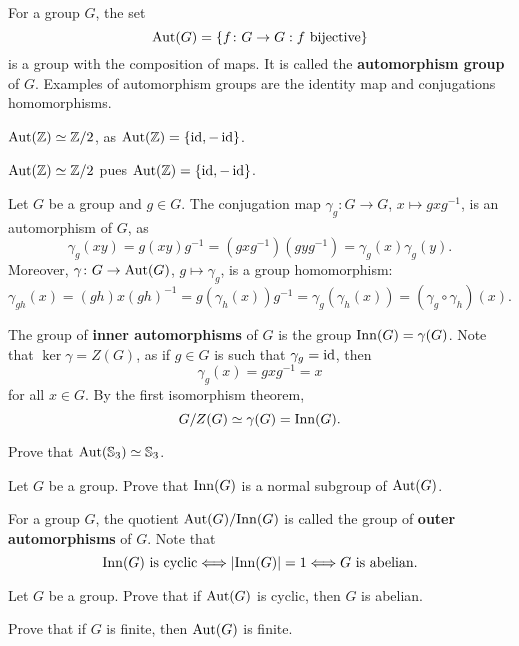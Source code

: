 For a group $G$, 
the set 
\[
\operatorname{Aut}(G)=\{f\colon G\to G:f\text{ bijective}\}
\]
is a group with the composition of maps. It is called 
the \textbf{automorphism group} of $G$. 
Examples of automorphism groups are the identity map and 
conjugations homomorphisms. 

\begin{example}
$\operatorname{Aut}(\mathbb{Z})\simeq\mathbb{Z}/2$, as $\operatorname{Aut}(\mathbb{Z})=\{\operatorname{id},-\operatorname{id}\}$.
\end{example}

\begin{example}
$\operatorname{Aut}(\mathbb{Z})\simeq\mathbb{Z}/2$ pues $\operatorname{Aut}(\mathbb{Z})=\{\operatorname{id},-\operatorname{id}\}$.
\end{example}

\begin{example}
Let $G$ be a group and $g\in G$. The conjugation 
map $\gamma_g\colon G\to G$, $x\mapsto gxg^{-1}$,
is an automorphism of $G$, as 
\[
\gamma_g(xy)=g(xy)g^{-1}=(gxg^{-1})(gyg^{-1})=\gamma_g(x)\gamma_g(y).
\]
Moreover, $\gamma\colon G\to\operatorname{Aut}(G)$, $g\mapsto\gamma_g$, is a group
homomorphism:
\[
\gamma_{gh}(x)=(gh)x(gh)^{-1}=g(\gamma_h(x))g^{-1}=\gamma_g(\gamma_h(x))=(\gamma_g\circ\gamma_h)(x).
\]

The group of \textbf{inner automorphisms} of $G$ is the 
group 
$\mathrm{Inn}(G)=\gamma(G)$. Note that $\ker\gamma=Z(G)$, as
if $g\in G$ is such that $\gamma_g=\operatorname{id}$, then 
\[
\gamma_g(x)=gxg^{-1}=x
\]
for all $x\in G$. By the first isomorphism theorem, 
\[
G/Z(G)\simeq \gamma(G)=\mathrm{Inn}(G).
\]
\end{example}

\begin{exercise}
\label{xca:aut(S3)}
    Prove that $\operatorname{Aut}(\mathbb{S}_3)\simeq\mathbb{S}_3$. 
\end{exercise}

\begin{exercise}
    Let $G$ be a group. Prove that $\mathrm{Inn}(G)$ is a normal subgroup of $\operatorname{Aut}(G)$. 
\end{exercise} 

For a group $G$, the quotient $\operatorname{Aut}(G)/\mathrm{Inn}(G)$ is called 
the group of \textbf{outer automorphisms} of $G$. 
Note that 
\[
\mathrm{Inn}(G)\text{ is cyclic}\Longleftrightarrow
|\mathrm{Inn}(G)|=1\Longleftrightarrow
G\text{ is abelian.}
\]

\begin{exercise}
Let $G$ be a group. 
Prove that if $\operatorname{Aut}(G)$ is cyclic, then 
$G$ is abelian. 
\end{exercise}

\begin{exercise}
    Prove that if $G$ is finite, then $\operatorname{Aut}(G)$ is finite.
\end{exercise}

